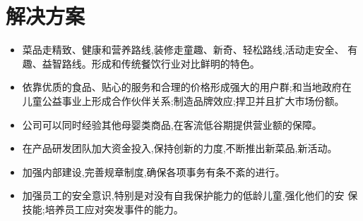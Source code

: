 \section{解决方案}
\begin{itemize}
\item  菜品走精致、健康和营养路线,装修走童趣、新奇、轻松路线,活动走安全、
有趣、益智路线。形成和传统餐饮行业对比鲜明的特色。
\item  依靠优质的食品、贴心的服务和合理的价格形成强大的用户群;和当地政府在
儿童公益事业上形成合作伙伴关系;制造品牌效应;捍卫并且扩大市场份额。
\item  公司可以同时经验其他母婴类商品,在客流低谷期提供营业额的保障。
\item  在产品研发团队加大资金投入,保持创新的力度,不断推出新菜品,新活动。
\item  加强内部建设,完善规章制度,确保各项事务有条不紊的进行。
\item  加强员工的安全意识,特别是对没有自我保护能力的低龄儿童,强化他们的安
保技能;培养员工应对突发事件的能力。
\end{itemize}
